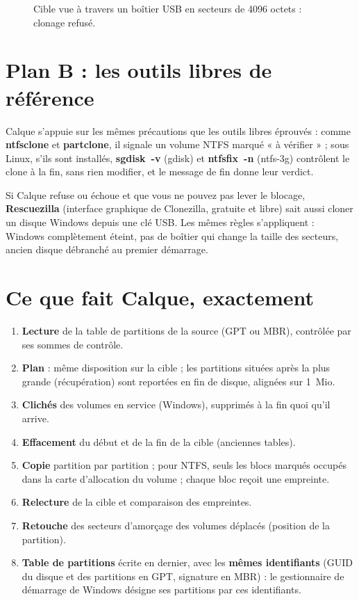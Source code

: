 \begin{figure}[h]
\caption{Cible vue à travers un boîtier USB en secteurs de 4096 octets : clonage refusé.}\label{fig:4k}
\end{figure}

\section{Plan B : les outils libres de référence}

Calque s'appuie sur les mêmes précautions que les outils libres éprouvés : comme \textbf{ntfsclone} et
\textbf{partclone}, il signale un volume NTFS marqué « à vérifier » ; sous Linux, s'ils sont installés,
\textbf{sgdisk~-v} (gdisk) et \textbf{ntfsfix~-n} (ntfs-3g) contrôlent le clone à la fin, sans rien
modifier, et le message de fin donne leur verdict.

Si Calque refuse ou échoue et que vous ne pouvez pas lever le blocage, \textbf{Rescuezilla} (interface
graphique de Clonezilla, gratuite et libre) sait aussi cloner un disque Windows depuis une clé USB.
Les mêmes règles s'appliquent : Windows complètement éteint, pas de boîtier qui change la taille des
secteurs, ancien disque débranché au premier démarrage.

\section{Ce que fait Calque, exactement}

\begin{enumerate}
\item \textbf{Lecture} de la table de partitions de la source (GPT ou MBR), contrôlée par ses sommes de
      contrôle.
\item \textbf{Plan} : même disposition sur la cible ; les partitions situées après la plus grande
      (récupération) sont reportées en fin de disque, alignées sur 1~Mio.
\item \textbf{Clichés} des volumes en service (Windows), supprimés à la fin quoi qu'il arrive.
\item \textbf{Effacement} du début et de la fin de la cible (anciennes tables).
\item \textbf{Copie} partition par partition ; pour NTFS, seuls les blocs marqués occupés dans la carte
      d'allocation du volume ; chaque bloc reçoit une empreinte.
\item \textbf{Relecture} de la cible et comparaison des empreintes.
\item \textbf{Retouche} des secteurs d'amorçage des volumes déplacés (position de la partition).
\item \textbf{Table de partitions} écrite en dernier, avec les \textbf{mêmes identifiants} (GUID du
      disque et des partitions en GPT, signature en MBR) : le gestionnaire de démarrage de Windows
      désigne ses partitions par ces identifiants.
\end{enumerate}

